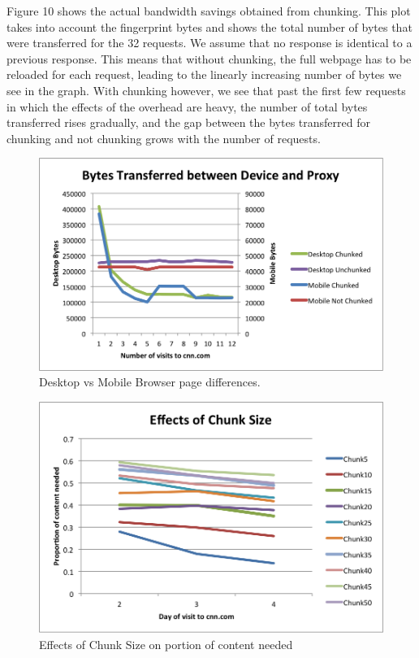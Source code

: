 Figure 10 shows the actual bandwidth savings obtained from chunking. This plot takes into account the fingerprint bytes and shows the total number of bytes that were transferred for the 32 requests.
We assume that no response is identical to a previous response. 
This means that without chunking, the full webpage has to be reloaded for each request, leading to the linearly increasing number of bytes we see in the graph. 
With chunking however, we see that past the first few requests in which the effects of the overhead are heavy, the number of total bytes transferred rises gradually, and the gap between the bytes transferred for chunking and not chunking grows with the number of requests.


\begin{figure}[h] 
\centering \includegraphics[width=\columnwidth]{images/desktopmobile.png}
\caption{Desktop vs Mobile Browser page differences.}
\end{figure}

\begin{figure}[h] 
\centering \includegraphics[width=\columnwidth]{images/chunksize.png}
\caption{Effects of Chunk Size on portion of content needed}
\end{figure}

